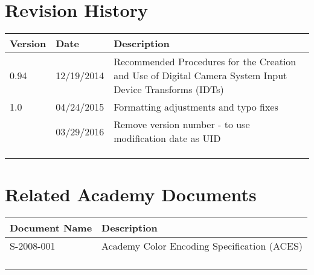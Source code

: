 \prelimsectionformat	%
\chapter{Revision History}

\begin{tabularx}{\linewidth}{|l|l|X|}
    \hline
    Version & Date       & Description \\ \hline
    0.94    & 12/19/2014 & Recommended Procedures for the Creation and Use of Digital Camera System Input Device Transforms (IDTs) \\ \hline
    1.0     & 04/24/2015 & Formatting adjustments and typo fixes \\ \hline
            & 03/29/2016 & Remove version number - to use modification date as UID \\ \hline
            & &  \\ \hline
            & &  \\ \hline
            & &  \\ \hline
\end{tabularx}

\vspace{0.25in} %

\chapter{Related Academy Documents} %
\begin{tabularx}{\linewidth}{|l|X|}
    \hline
    Document Name & Description  
    \\ \hline
    S-2008-001 & Academy Color Encoding Specification (ACES) \\ \hline
    & \\ \hline
    & \\ \hline
    & \\ \hline
    & \\ \hline
\end{tabularx}